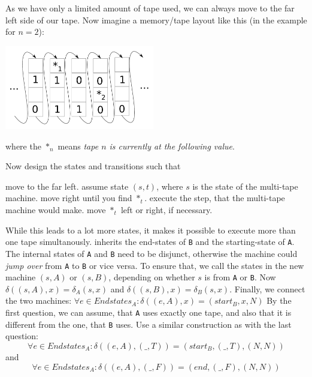 \begin{Answer}
	\Question As we have only a limited amount of tape used, we can always move 
		to the far left side of our tape. Now imagine a memory/tape layout like 
		this (in the example for $n=2$):
		\begin{center}
			\includegraphics[width=0.49\textwidth]{computability/completeness/pictures/multitape}
		\end{center}
		where the $*_n$ means \emph{tape $n$ is currently at the following value}. 
		
		Now design the states and transitions such that
		\begin{algorithmic}[1]
				\State move to the far left.
				\State assume state $(s, t)$, where $s$ is the state of the multi-tape machine.
				\State move right until you find $*_t$.
				\State execute the step, that the multi-tape machine would make.
				\State move $*_t$ left or right, if necessary.
			\EndFor
		\end{algorithmic}
		While this leads to a lot more states, it makes it possible to execute 
		more than one tape simultanously.
	 inherits the end-states of {\tt B} and the 
		starting-state of {\tt A}. The internal states of {\tt A} and {\tt B} 
		need to be disjunct, otherwise the machine could \emph{jump over} from 
		{\tt A} to {\tt B} or vice versa. To ensure that, we call the states in 
		the new machine $(s, A)$ or $(s, B)$, depending on whether $s$ is from 
		{\tt A} or {\tt B}. Now $\delta((s,A), x) = \delta_A(s,x)$ and
		$\delta((s,B), x) = \delta_B(s,x)$. Finally, we connect the two machines:
		$\forall e\in Endstates_A: \delta((e, A), x) = (start_B, x, N)$
	\Question 
		\subQuestion By the first question, we can assume, that {\tt A}  uses exactly 
			one tape, and also that it is different from the one, that {\tt B} 
			uses. Use a similar construction as with the last question:
			\[\forall e\in Endstates_A: \delta((e,A), (\_, T)) = (start_B, (\_, T), (N, N))\]
			and
			\[\forall e\in Endstates_A: \delta((e,A), (\_, F)) = (end, (\_, F), (N, N))\]


\end{Answer}
